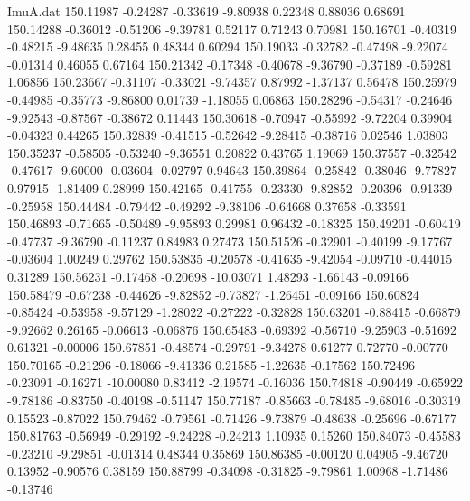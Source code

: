 \begin{filecontents}{ImuA.dat}
 150.11987   -0.24287   -0.33619   -9.80938    0.22348    0.88036    0.68691
 150.14288   -0.36012   -0.51206   -9.39781    0.52117    0.71243    0.70981
 150.16701   -0.40319   -0.48215   -9.48635    0.28455    0.48344    0.60294
 150.19033   -0.32782   -0.47498   -9.22074   -0.01314    0.46055    0.67164
 150.21342   -0.17348   -0.40678   -9.36790   -0.37189   -0.59281    1.06856
 150.23667   -0.31107   -0.33021   -9.74357    0.87992   -1.37137    0.56478
 150.25979   -0.44985   -0.35773   -9.86800    0.01739   -1.18055    0.06863
 150.28296   -0.54317   -0.24646   -9.92543   -0.87567   -0.38672    0.11443
 150.30618   -0.70947   -0.55992   -9.72204    0.39904   -0.04323    0.44265
 150.32839   -0.41515   -0.52642   -9.28415   -0.38716    0.02546    1.03803
 150.35237   -0.58505   -0.53240   -9.36551    0.20822    0.43765    1.19069
 150.37557   -0.32542   -0.47617   -9.60000   -0.03604   -0.02797    0.94643
 150.39864   -0.25842   -0.38046   -9.77827    0.97915   -1.81409    0.28999
 150.42165   -0.41755   -0.23330   -9.82852   -0.20396   -0.91339   -0.25958
 150.44484   -0.79442   -0.49292   -9.38106   -0.64668    0.37658   -0.33591
 150.46893   -0.71665   -0.50489   -9.95893    0.29981    0.96432   -0.18325
 150.49201   -0.60419   -0.47737   -9.36790   -0.11237    0.84983    0.27473
 150.51526   -0.32901   -0.40199   -9.17767   -0.03604    1.00249    0.29762
 150.53835   -0.20578   -0.41635   -9.42054   -0.09710   -0.44015    0.31289
 150.56231   -0.17468   -0.20698  -10.03071    1.48293   -1.66143   -0.09166
 150.58479   -0.67238   -0.44626   -9.82852   -0.73827   -1.26451   -0.09166
 150.60824   -0.85424   -0.53958   -9.57129   -1.28022   -0.27222   -0.32828
 150.63201   -0.88415   -0.66879   -9.92662    0.26165   -0.06613   -0.06876
 150.65483   -0.69392   -0.56710   -9.25903   -0.51692    0.61321   -0.00006
 150.67851   -0.48574   -0.29791   -9.34278    0.61277    0.72770   -0.00770
 150.70165   -0.21296   -0.18066   -9.41336    0.21585   -1.22635   -0.17562
 150.72496   -0.23091   -0.16271  -10.00080    0.83412   -2.19574   -0.16036
 150.74818   -0.90449   -0.65922   -9.78186   -0.83750   -0.40198   -0.51147
 150.77187   -0.85663   -0.78485   -9.68016   -0.30319    0.15523   -0.87022
 150.79462   -0.79561   -0.71426   -9.73879   -0.48638   -0.25696   -0.67177
 150.81763   -0.56949   -0.29192   -9.24228   -0.24213    1.10935    0.15260
 150.84073   -0.45583   -0.23210   -9.29851   -0.01314    0.48344    0.35869
 150.86385   -0.00120    0.04905   -9.46720    0.13952   -0.90576    0.38159
 150.88799   -0.34098   -0.31825   -9.79861    1.00968   -1.71486   -0.13746

\end{filecontents}
